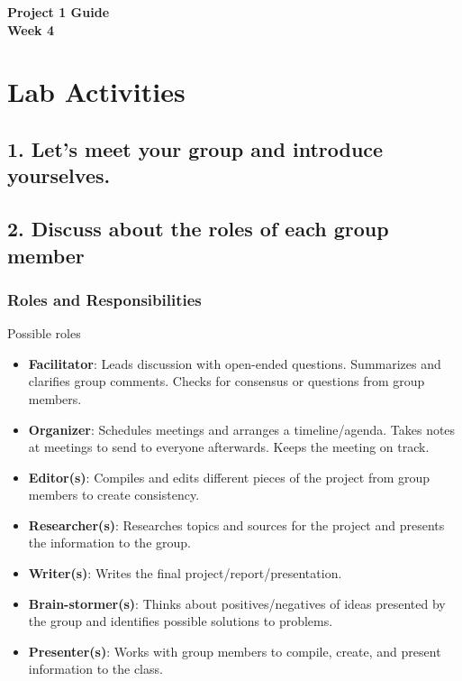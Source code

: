\documentclass[12pt]{article}
\begin{document}
\begin{center}
\textbf{\Large Project 1 Guide \\ Week 4 } 
\end{center}




\section*{Lab Activities}

\subsection*{1. Let's meet your group and introduce yourselves.  } 

\vspace{6\baselineskip}



\subsection*{2. Discuss about the roles of each group member}

\subsubsection*{Roles and Responsibilities}
Possible roles
\begin{itemize}
    \item \textbf{Facilitator}: Leads discussion with open-ended questions. Summarizes and clarifies group comments. Checks for consensus or questions from group members.
    \item \textbf{Organizer}: Schedules meetings and arranges a timeline/agenda. Takes notes at meetings to send to everyone afterwards. Keeps the meeting on track.
    \item \textbf{Editor(s)}: Compiles and edits different pieces of the project from group members to create consistency.
    \item \textbf{Researcher(s)}: Researches topics and sources for the project and presents the information to the group.
    \item \textbf{Writer(s)}: Writes the final project/report/presentation.
    \item \textbf{Brain-stormer(s)}: Thinks about positives/negatives of ideas presented by the group and identifies possible solutions to problems.
    \item \textbf{Presenter(s)}: Works with group members to compile, create, and present information to the class.
\end{itemize}
\end{document}
